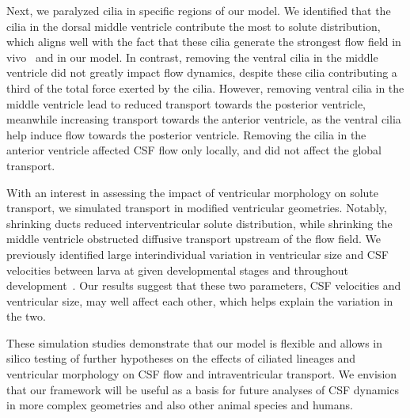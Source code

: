 \documentclass{WileyMSP-template}
\begin{document}
Next, we paralyzed cilia in specific regions of
our model. We identified that the cilia in the dorsal middle ventricle contribute
the most to solute distribution, which aligns well with the fact
that these cilia generate the strongest flow field in vivo~\cite{Olstad2019CiliaryDevelopment}
and in our model. In contrast, removing the ventral cilia in the middle ventricle
did not greatly impact flow dynamics, despite these cilia contributing a third of
the total force exerted by the cilia. However, removing ventral cilia in the middle ventricle
lead to reduced transport towards the posterior ventricle,
meanwhile increasing transport towards the anterior ventricle,
as the ventral cilia help induce flow towards the posterior ventricle.
Removing the cilia in the anterior ventricle affected CSF flow only locally,
and did not affect the global transport.

With an interest in assessing the impact of ventricular morphology on solute transport,
we simulated transport in modified ventricular geometries.
Notably, shrinking ducts reduced interventricular solute distribution, while shrinking
the middle ventricle obstructed diffusive transport upstream of the flow field.
We previously identified large interindividual variation in ventricular size and
CSF velocities between larva at given developmental stages and throughout
development~\cite{Olstad2019CiliaryDevelopment, DGama2025MotileBrain, Jeong2024TheZebrafish}.
Our results suggest that these two parameters, CSF velocities and ventricular size,
may well affect each other, which helps explain the variation in the two.

These simulation studies demonstrate that our model is flexible and allows in silico
testing of further hypotheses on the effects of ciliated
lineages and ventricular morphology on CSF flow and intraventricular transport.
We envision that our framework will be useful as a basis for future analyses of
CSF dynamics in more complex geometries and also other animal species and humans.
\end{document}
